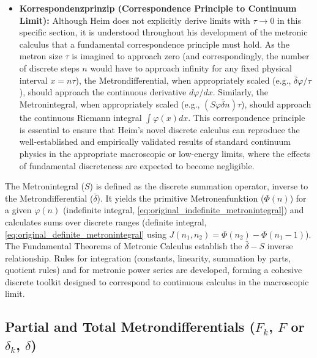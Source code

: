 \documentclass[12pt]{article}
\newcommand{\metron}{\tau}
\newcommand{\metronintegral}{S}
\newcommand{\metronenziffer}{n}
\begin{document}
\begin{itemize}
    \item \textbf{Korrespondenzprinzip (Correspondence Principle to Continuum Limit):}
    Although Heim does not explicitly derive limits with \( \metron \to 0 \) in this specific section, it is understood throughout his development of the metronic calculus that a fundamental correspondence principle must hold. As the metron size \( \metron \) is imagined to approach zero (and correspondingly, the number of discrete steps \( \metronenziffer \) would have to approach infinity for any fixed physical interval \( x = \metronenziffer\metron \)), the Metrondifferential, when appropriately scaled (e.g., \( \bar{\delta}\varphi/\metron \)), should approach the continuous derivative \( d\varphi/dx \). Similarly, the Metronintegral, when appropriately scaled (e.g., \( (\metronintegral\varphi \bar{\delta}\metronenziffer)\metron \)), should approach the continuous Riemann integral \( \int\varphi(x)dx \). This correspondence principle is essential to ensure that Heim's novel discrete calculus can reproduce the well-established and empirically validated results of standard continuum physics in the appropriate macroscopic or low-energy limits, where the effects of fundamental discreteness are expected to become negligible.
\end{itemize}

The Metronintegral (\(\metronintegral\)) is defined as the discrete summation operator, inverse to the Metrondifferential (\(\bar{\delta}\)). It yields the primitive Metronenfunktion (\(\Phi(n)\)) for a given \(\varphi(n)\) (indefinite integral, \eqref{eq:original_indefinite_metronintegral}) and calculates sums over discrete ranges (definite integral, \eqref{eq:original_definite_metronintegral} using \(J(n_1,n_2) = \Phi(n_2) - \Phi(n_1-1)\)). The Fundamental Theorems of Metronic Calculus establish the \(\bar{\delta}-S\) inverse relationship. Rules for integration (constants, linearity, summation by parts, quotient rules) and for metronic power series are developed, forming a cohesive discrete toolkit designed to correspond to continuous calculus in the macroscopic limit.

\subsection{Partial and Total Metrondifferentials (\texorpdfstring{\( F_k \)}{Fk}, \texorpdfstring{\( F \)}{F} or \texorpdfstring{\( \delta_k \)}{delta-k}, \texorpdfstring{\( \delta \)}{delta})}
\label{sec:partial_total_delta}
\end{document}

